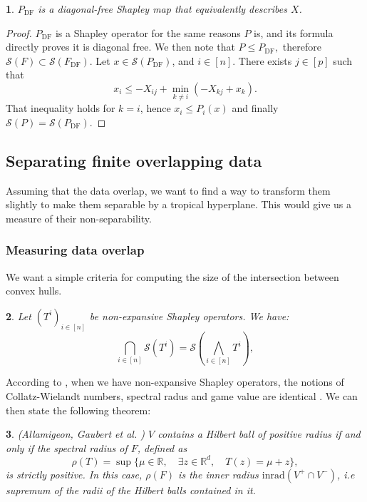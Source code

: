 \documentclass[oneside,english]{amsart}
\numberwithin{equation}{section}
\numberwithin{figure}{section}
\theoremstyle{plain}
\newtheorem{thm}{\protect\theoremname}
\theoremstyle{definition}
\theoremstyle{plain}
\newtheorem{prop}[thm]{\protect\propositionname}
\theoremstyle{remark}
\theoremstyle{plain}
\newtheorem{lem}[thm]{\protect\lemmaname}
\theoremstyle{definition}
\theoremstyle{definition}
\providecommand{\lemmaname}{Lemma}
\providecommand{\propositionname}{Proposition}
\providecommand{\theoremname}{Theorem}
\begin{document}
\begin{prop}
$P_{\text{DF}}$ is a diagonal-free Shapley map that equivalently
describes $X$. 
\end{prop}

\begin{proof}
$P_{\text{DF}}$ is a Shapley operator for the same reasons $P$ is,
and its formula directly proves it is diagonal free. We then note
that $P\leq P_{\text{DF}},$ therefore $\mathcal{S}(F)\subset\mathcal{S}(F_{\text{DF}}).$
Let $x\in\mathcal{S}(P_{\text{DF}})$, and $i\in[n]$. There exists
$j\in[p]$ such that
\[
x_{i}\leq-X_{ij}+\min_{k\ne i}(-X_{kj}+x_{k}).
\]
That inequality holds for $k=i$, hence $x_{i}\leq P_{i}(x)$ and
finally $\mathcal{S}(P)=\mathcal{S}(P_{\text{DF}}).$
\end{proof}

\subsection{Separating finite overlapping data}

Assuming that the data overlap, we want to find a way to transform
them slightly to make them separable by a tropical hyperplane. This
would give us a measure of their non-separability.

\subsubsection{Measuring data overlap}

We want a simple criteria for computing the size of the intersection
between convex hulls.
\begin{lem}
Let $(T^{i})_{i\in[n]}$ be non-expansive Shapley operators. We have:
\[
\bigcap_{i\in[n]}\mathcal{S}(T^{i})=\mathcal{S}\left(\bigwedge_{i\in[n]}T^{i}\right),
\]
\end{lem}

According to \cite{AKIAN2012}, when we have non-expansive Shapley
operators, the notions of Collatz-Wielandt numbers, spectral radus
and game value are identical . We can then state the following theorem: 
\begin{thm}
(Allamigeon, Gaubert et al. \cite{Allamigeon2018}) $V$ contains
a Hilbert ball of positive radius if and only if the spectral radius
of $F$, defined as 
\[
\rho(T)=\sup\{\mu\in\mathbb{R},\quad\exists z\in\mathbb{R}^{d},\quad T(z)=\mu+z\},
\]
is strictly positive. In this case, $\rho(F)$ is the inner radius
$\text{inrad}(V^{+}\cap V^{-})$, i.e supremum of the radii of the
Hilbert balls contained in it. 
\end{thm}
\end{document}
